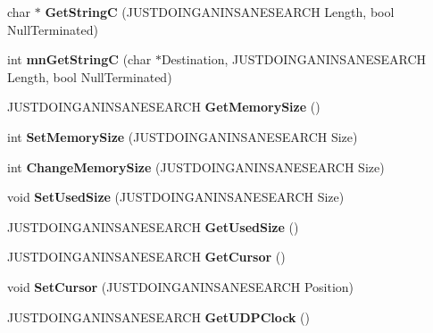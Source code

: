 \begin{DoxyCompactItemize}
\item 
\hypertarget{classcl_packet_a63bfc6c37965eb204d9ec29f25d5f6b7}{
char $\ast$ {\bfseries GetStringC} (JUSTDOINGANINSANESEARCH Length, bool NullTerminated)}
\label{classcl_packet_a63bfc6c37965eb204d9ec29f25d5f6b7}

\item 
\hypertarget{classcl_packet_a1baa410420f22e2ad5cfd1e332cc07e2}{
int {\bfseries mnGetStringC} (char $\ast$Destination, JUSTDOINGANINSANESEARCH Length, bool NullTerminated)}
\label{classcl_packet_a1baa410420f22e2ad5cfd1e332cc07e2}

\item 
\hypertarget{classcl_packet_a48b0b69eec04aa3ccbcacaa7dedf2663}{
JUSTDOINGANINSANESEARCH {\bfseries GetMemorySize} ()}
\label{classcl_packet_a48b0b69eec04aa3ccbcacaa7dedf2663}

\item 
\hypertarget{classcl_packet_a3d26c6ead396708bf17e73767cdaa3e8}{
int {\bfseries SetMemorySize} (JUSTDOINGANINSANESEARCH Size)}
\label{classcl_packet_a3d26c6ead396708bf17e73767cdaa3e8}

\item 
\hypertarget{classcl_packet_a28861fa5b3828c771f8f837ad2a4883a}{
int {\bfseries ChangeMemorySize} (JUSTDOINGANINSANESEARCH Size)}
\label{classcl_packet_a28861fa5b3828c771f8f837ad2a4883a}

\item 
\hypertarget{classcl_packet_ad183ba107fb53188b4322606b2bb19f5}{
void {\bfseries SetUsedSize} (JUSTDOINGANINSANESEARCH Size)}
\label{classcl_packet_ad183ba107fb53188b4322606b2bb19f5}

\item 
\hypertarget{classcl_packet_af736739e88e567770628669c692dae8d}{
JUSTDOINGANINSANESEARCH {\bfseries GetUsedSize} ()}
\label{classcl_packet_af736739e88e567770628669c692dae8d}

\item 
\hypertarget{classcl_packet_a7b4fb8df9862e93e86706bd8898a0809}{
JUSTDOINGANINSANESEARCH {\bfseries GetCursor} ()}
\label{classcl_packet_a7b4fb8df9862e93e86706bd8898a0809}

\item 
\hypertarget{classcl_packet_a812095bdc567b2c195dbda4b42d4360d}{
void {\bfseries SetCursor} (JUSTDOINGANINSANESEARCH Position)}
\label{classcl_packet_a812095bdc567b2c195dbda4b42d4360d}

\item 
\hypertarget{classcl_packet_a20f0ffa00380c6eaade2fc7b4decef8b}{
JUSTDOINGANINSANESEARCH {\bfseries GetUDPClock} ()}
\label{classcl_packet_a20f0ffa00380c6eaade2fc7b4decef8b}


\end{DoxyCompactItemize}
